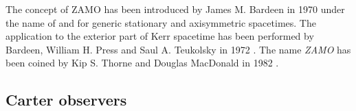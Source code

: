 \begin{hist}
The concept of ZAMO has been introduced by James M. Bardeen in 1970 \cite{Barde70b}
under the name of  and for generic stationary and axisymmetric spacetimes. The application
to the exterior part of Kerr spacetime has been performed by Bardeen, William H. Press and Saul A. Teukolsky
in 1972 \cite{BardePT72}. The name \emph{ZAMO} has been coined by Kip S. Thorne and Douglas MacDonald
in 1982 \cite{ThornM82}.
\end{hist}

\subsection{Carter observers} \label{s:ker:Carter_obs}

